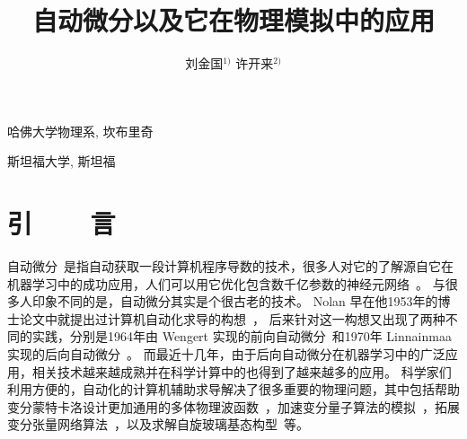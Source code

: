 \documentclass[A4,twoside,UTF8]{ctexart}
\begin{document}
\apsname

\title{自动微分以及它在物理模拟中的应用\fivestar}%

\author{刘金国$^{1)}$ \quad 许开来$^{2)}$}

\address{1)}{哈佛大学物理系, 坎布里奇 }
\address{2)}{斯坦福大学, 斯坦福 }









{}\baselineskip


\section{引~~~~言}


    自动微分~\cite{Griewank2008}是指自动获取一段计算机程序导数的技术，很多人对它的了解源自它在机器学习中的成功应用，人们可以用它优化包含数千亿参数的神经元网络~\cite{Rosset2019}。
与很多人印象不同的是，自动微分其实是个很古老的技术。
Nolan 早在他1953年的博士论文中就提出过计算机自动化求导的构想~\cite{Nolan1953}，
后来针对这一构想又出现了两种不同的实践，分别是1964年由 Wengert 实现的前向自动微分~\cite{Wengert1964}和1970年 Linnainmaa 实现的后向自动微分~\cite{Linnainmaa1976}。
而最近十几年，由于后向自动微分在机器学习中的广泛应用，相关技术越来越成熟并在科学计算中的也得到了越来越多的应用。
科学家们利用方便的，自动化的计算机辅助求导解决了很多重要的物理问题，其中包括帮助变分蒙特卡洛设计更加通用的多体物理波函数~\cite{Gutzwiller1963,Carleo2017, Deng2017,Cai2018}，加速变分量子算法的模拟~\cite{Luo2020}，拓展变分张量网络算法~\cite{Liao2019}，以及求解自旋玻璃基态构型~\cite{Liu2021}等。
\end{document}
